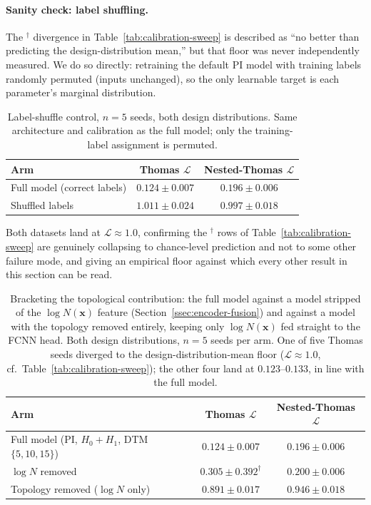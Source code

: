 \documentclass[11pt,letterpaper]{article}
\newcommand{\1}{\mathds{1}}
\newcommand{\pc}{\mathbf{x}}
\theoremstyle{plain}
\theoremstyle{definitioncolon}
\begin{document}
\paragraph{Sanity check: label shuffling.} The $^\dagger$ divergence in
Table~\ref{tab:calibration-sweep} is described as ``no better than predicting
the design-distribution mean,'' but that floor was never independently
measured. We do so directly: retraining the default PI model with training
labels randomly permuted (inputs unchanged), so the only learnable target is
each parameter's marginal distribution.
\begin{table}[tbp]
\centering
\small
\begin{tabular}{lcc}
\toprule
Arm & Thomas $\mathcal{L}$ & Nested-Thomas $\mathcal{L}$ \\
\midrule
Full model (correct labels) & $0.124 \pm 0.007$ & $0.196 \pm 0.006$ \\
Shuffled labels             & $1.011 \pm 0.024$ & $0.997 \pm 0.018$ \\
\bottomrule
\end{tabular}
\caption{Label-shuffle control, $n=5$ seeds, both design distributions. Same
architecture and calibration as the full model; only the training-label
assignment is permuted.}
\label{tab:label-shuffle}
\end{table}
Both datasets land at $\mathcal{L}\approx1.0$, confirming the $^\dagger$ rows
of Table~\ref{tab:calibration-sweep} are genuinely collapsing to
chance-level prediction and not to some other failure mode, and giving an
empirical floor against which every other result in this section can be
read.

\begin{table}[tbp]
\centering
\small
\begin{tabular}{lcc}
\toprule
Arm & Thomas $\mathcal{L}$ & Nested-Thomas $\mathcal{L}$ \\
\midrule
Full model (PI, $H_0{+}H_1$, DTM$\{5,10,15\}$) & $0.124 \pm 0.007$ & $0.196 \pm 0.006$ \\
$\log N$ removed & $0.305 \pm 0.392^\dagger$ & $0.200 \pm 0.006$ \\
Topology removed ($\log N$ only) & $0.891 \pm 0.017$ & $0.946 \pm 0.018$ \\
\bottomrule
\end{tabular}
\caption{Bracketing the topological contribution: the full model against a
model stripped of the $\log N(\pc)$ feature (Section~\ref{ssec:encoder-fusion})
and against a model with the topology removed entirely, keeping only $\log
N(\pc)$ fed straight to the FCNN head. Both design distributions, $n=5$ seeds
per arm. One of five Thomas seeds diverged to the design-distribution-mean
floor ($\mathcal{L}\approx1.0$, cf.\ Table~\ref{tab:calibration-sweep}); the
other four land at $0.123$--$0.133$, in line with the full model.}
\label{tab:logn-ablation}
\end{table}
\end{document}
